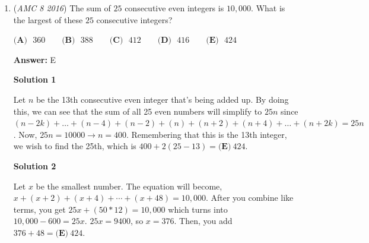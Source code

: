 \begin{enumerate}
 $\textbf{(A)}\mbox{ }36\qquad\textbf{(B)}\mbox{ }42\qquad\textbf{(C)}\mbox{ }43\qquad\textbf{(D)}\mbox{ }60\qquad\textbf{(E)}\mbox{ }72$

 \textbf{Answer: }C



\textbf{Solution 1}

From any $n-$th race, only $\frac{1}{6}$ will continue on. Since we wish to find the total number of races, a column representing the races over time is ideal.Starting with the first race:
 \[\frac{216}{6}=36\]
 \[\frac{36}{6}=6\]
 \[\frac{6}{6}=1\]Adding all of the numbers in the second column yields $\boxed{\textbf{(C)}\ 43}$




\textbf{Solution 2}

Every race eliminates $5$ players. The winner is decided when there is only $1$ runner left. You can construct the equation: $216$ - $5x$ = $1$. Thus, $215$ players have to be eliminated. Therefore, we need $\frac{215}{5}$ games to decide the winner, or $\boxed{\textbf{(C)}\ 43}$



	\item (\textit{AMC 8 2016}) The sum of $25$ consecutive even integers is $10,000$. What is the largest of these $25$ consecutive integers?


 $\textbf{(A)}\mbox{ }360\qquad\textbf{(B)}\mbox{ }388\qquad\textbf{(C)}\mbox{ }412\qquad\textbf{(D)}\mbox{ }416\qquad\textbf{(E)}\mbox{ }424$

 \textbf{Answer: }E



\textbf{Solution 1}

Let $n$ be the 13th consecutive even integer that's being added up. By doing this, we can see that the sum of all 25 even numbers will simplify to $25n$ since $(n-2k)+\dots+(n-4)+(n-2)+(n)+(n+2)+(n+4)+ \dots +(n+2k)=25n$. Now, $25n=10000 \rightarrow n=400$. Remembering that this is the 13th integer, we wish to find the 25th, which is $400+2(25-13)=\boxed{\textbf{(E)}\ 424}$.

 



\textbf{Solution 2}

Let $x$ be the smallest number. The equation will become, $x+(x+2)+(x+4)+\cdots +(x+48)=10,000$. After you combine like terms, you get $25x+(50*12)=10,000$ which turns into $10,000-600=25x$. $25x=9400$, so $x=376$. Then, you add $376+48 = \boxed{\textbf{(E)}\ 424}$.


\end{enumerate}
